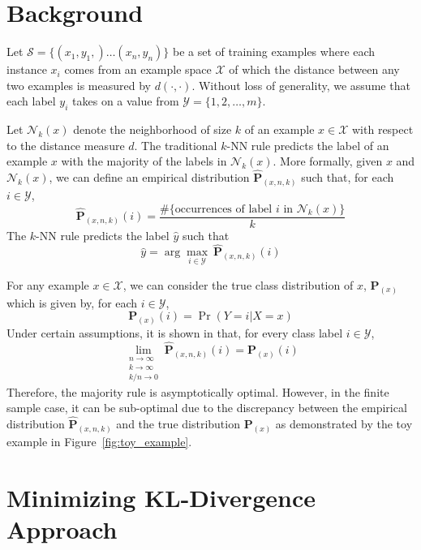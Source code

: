 \documentclass{article}
\begin{document}
\section{Background}
\label{sec:background}

\newcommand{\X}{\mathcal{X}}
\newcommand{\Y}{\mathcal{Y}}
\newcommand{\trainset}{\mathcal{S}}

Let $\trainset = \{ (x_1,y_1,) \ldots (x_n,y_n)\}$ be a set of
training examples where each instance $x_i$ comes from an example
space $\X$ of which the distance between any two examples is measured by
$d(\cdot,\cdot)$. Without loss of generality, we assume that each
label $y_i$ takes on a value from $\Y = \{1,2,\ldots,m\}$.

\newcommand{\nh}{\mathcal{N}}
\newcommand{\Pemp}{\widehat{\mathbf{P}}_{(x,n,k)}}
\newcommand{\Ptrue}{\mathbf{P}_{(x)}}

Let $\nh_k(x)$ denote the neighborhood of size $k$ of an example $x
\in \X$ with respect to the distance measure $d$. The traditional
$k$-NN rule predicts the label of an example $x$ with the majority of
the labels in $\nh_k(x)$. More formally, given $x$ and $\nh_k(x)$, we
can define an empirical distribution $\Pemp$ such that, for each $i \in \Y$, 
\[
\Pemp(i) = \frac{\#\{ \mbox{occurrences of label } i \mbox{ in } \nh_k(x)\}}{k}
\]
The $k$-NN rule predicts the label $\hat{y}$ such that
\[
\hat{y} = \arg\max_{i \in \Y} \: \Pemp(i)
\]

For any example $x \in \X$, we can consider the true class
distribution of $x$, $\Ptrue$ which is given by, for each $i \in \Y$,
\[
\Ptrue(i) = \Pr(Y=i | X=x)
\]
Under certain assumptions, it is shown in \cite{Fix1951} that,
for every class label $i \in \Y$, 
\[
\lim_{\substack{n \to \infty\\k \to \infty\\k/n \to 0}} \Pemp(i) = \Ptrue(i)
\]
Therefore, the majority rule is asymptotically optimal. However, in
the finite sample case, it can be sub-optimal due to the discrepancy
between the empirical distribution $\Pemp$ and the true distribution
$\Ptrue$ as demonstrated by the toy example in
Figure~\ref{fig:toy_example}.

\section{Minimizing KL-Divergence Approach}

\newcommand{\dkl}{D_{\mathrm{KL}}}
\newcommand{\Qemp}{\widehat{\mathbf{Q}}_(j,n,k)}
\newcommand{\Qtrue}{\mathbf{Q}_(j)}
\end{document}
